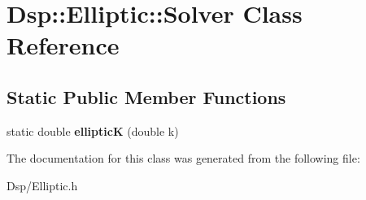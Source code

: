 \hypertarget{classDsp_1_1Elliptic_1_1Solver}{\section{Dsp\-:\-:Elliptic\-:\-:Solver Class Reference}
\label{classDsp_1_1Elliptic_1_1Solver}
}
\subsection*{Static Public Member Functions}
\begin{DoxyCompactItemize}
\item 
\hypertarget{classDsp_1_1Elliptic_1_1Solver_af22de605d71d5f06439e159f19d5971e}{static double {\bfseries elliptic\-K} (double k)}\label{classDsp_1_1Elliptic_1_1Solver_af22de605d71d5f06439e159f19d5971e}

\end{DoxyCompactItemize}


The documentation for this class was generated from the following file\-:\begin{DoxyCompactItemize}
\item 
Dsp/Elliptic.\-h\end{DoxyCompactItemize}
